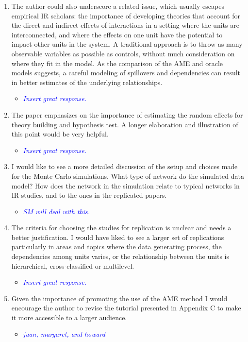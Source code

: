 \begin{enumerate}
\begin{itemize}
{{		}}
	\end{itemize}
	\item The author could also underscore a related issue, which usually escapes empirical IR scholars: the importance of developing theories that account for the direct and indirect effects of interactions in a setting where the units are interconnected, and where the effects on one unit have the potential to impact other units in the system. A traditional approach is to throw as many observable variables as possible as controls, without much consideration on where they fit in the model. As the comparison of the AME and oracle models suggests, a careful modeling of spillovers and dependencies can result in better estimates of the underlying relationships.
	\begin{itemize}
		\item \textcolor{blue}{ \emph{
		Insert great response.
		}}
	\end{itemize}
	\item The paper emphasizes on the importance of estimating the random effects for theory building and hypothesis test. A longer elaboration and illustration of this point would be very helpful.
	\begin{itemize}
		\item \textcolor{blue}{ \emph{
		Insert great response.
		}}
	\end{itemize}
	\item I would like to see a more detailed discussion of the setup and choices made for the Monte Carlo simulations. What type of network do the simulated data model? How does the network in the simulation relate to typical networks in IR studies, and to the ones in the replicated papers.
	\begin{itemize}
		\item \textcolor{blue}{ \emph{
		SM will deal with this.
		}}
	\end{itemize}
	\item The criteria for choosing the studies for replication is unclear and needs a better justification. I would have liked to see a larger set of replications particularly in areas and topics where the data generating process, the dependencies among units varies, or the relationship between the units is hierarchical, cross-classified or multilevel.
	\begin{itemize}
		\item \textcolor{blue}{ \emph{
		Insert great response.
		}}
	\end{itemize}
	\item Given the importance of promoting the use of the AME method I would encourage the author to revise the tutorial presented in Appendix C to make it more accessible to a larger audience.
	\begin{itemize}
		\item \textcolor{blue}{ \emph{
		juan, margaret, and howard
		}}
	\end{itemize}
\end{enumerate}
